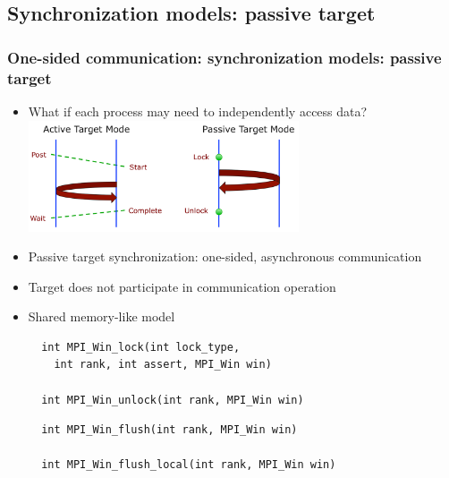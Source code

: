 \documentclass{beamer}
\begin{document}
\subsection{Synchronization models: passive target}
\begin{frame}[fragile]
  \frametitle{One-sided communication: synchronization models: passive target}
  \begin{itemize}
  \item What if each process may need to independently access data?
    \includegraphics[width=8.0cm]{graphs/passive.png}
  \item Passive target synchronization: one-sided, asynchronous communication
  \item Target does not participate in communication operation
  \item Shared memory-like model
{\color{mycolorcode}
{\tiny
\begin{multicols}{2}
\begin{verbatim}
  int MPI_Win_lock(int lock_type, 
    int rank, int assert, MPI_Win win)

  int MPI_Win_unlock(int rank, MPI_Win win)
\end{verbatim}
\begin{verbatim}
  int MPI_Win_flush(int rank, MPI_Win win)

  int MPI_Win_flush_local(int rank, MPI_Win win)
\end{verbatim}
\end{multicols}
}
}
  \end{itemize}
\end{frame}
\end{document}
